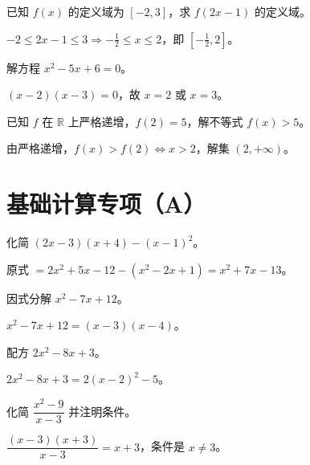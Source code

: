\begin{problem}
已知 $f(x)$ 的定义域为 $[-2,3]$，求 $f(2x-1)$ 的定义域。
\end{problem}
\begin{solution}
$-2\le 2x-1\le3\Rightarrow -\tfrac12\le x\le2$，即 $\left[-\tfrac12,2\right]$。
\end{solution}

\begin{problem}
解方程 $x^2-5x+6=0$。
\end{problem}
\begin{solution}
$(x-2)(x-3)=0$，故 $x=2$ 或 $x=3$。
\end{solution}

\begin{problem}
已知 $f$ 在 $\mathbb{R}$ 上严格递增，$f(2)=5$，解不等式 $f(x)>5$。
\end{problem}
\begin{solution}
由严格递增，$f(x)>f(2)\iff x>2$，解集 $(2,+\infty)$。
\end{solution}

\section{基础计算专项（A）}

\begin{problem}
化简 $(2x-3)(x+4)-(x-1)^2$。
\end{problem}
\begin{solution}
原式 $=2x^2+5x-12-(x^2-2x+1)=x^2+7x-13$。
\end{solution}

\begin{problem}
因式分解 $x^2-7x+12$。
\end{problem}
\begin{solution}
$x^2-7x+12=(x-3)(x-4)$。
\end{solution}

\begin{problem}
配方 $2x^2-8x+3$。
\end{problem}
\begin{solution}
$2x^2-8x+3=2(x-2)^2-5$。
\end{solution}

\begin{problem}
化简 $\dfrac{x^2-9}{x-3}$ 并注明条件。
\end{problem}
\begin{solution}
$\dfrac{(x-3)(x+3)}{x-3}=x+3$，条件是 $x\ne3$。
\end{solution}

